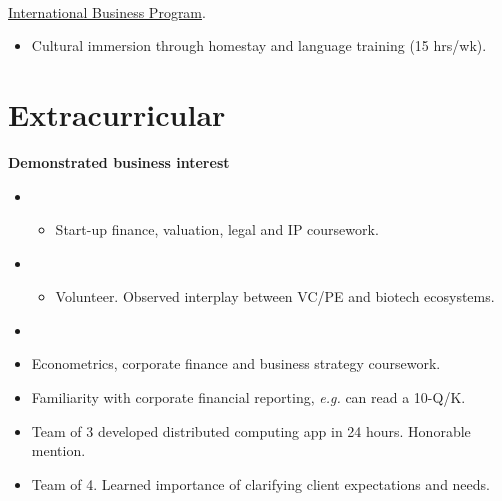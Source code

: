 \documentclass[margin]{res}
\begin{document}
\begin{sloppypar}
\begin{resume}
\\
\href{http://www.disabroad.org/study-abroad/programs/business/}{International Business Program}.
\begin{itemize}
    \item Cultural immersion through homestay and language training (15 hrs/wk). 
\end{itemize}

\section{Extracurricular}
\textbf{Demonstrated business interest}
\begin{itemize}
    \item {}
        \begin{itemize}
                \item Start-up finance, valuation, legal and IP coursework.
        \end{itemize}
    \item {}
        \begin{itemize}
                \item Volunteer. Observed interplay between VC/PE and biotech ecosystems.
        \end{itemize}
    \item {}
    \item Econometrics, corporate finance and business strategy coursework.
    \item Familiarity with corporate financial reporting, \textit{e.g.} can read a 10-Q/K.
\end{itemize}

    \begin{itemize}
        \item Team of 3 developed distributed computing app in 24 hours. Honorable mention.
    \end{itemize}

    \begin{itemize}
            \item Team of 4. Learned importance of clarifying client expectations and needs.
    \end{itemize}


\end{resume}
\end{sloppypar}
\end{document}
